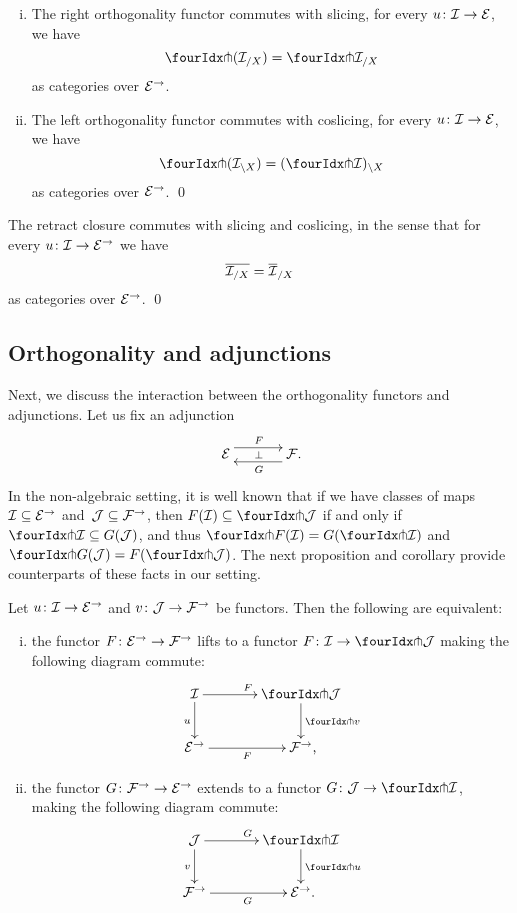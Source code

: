 \documentclass[reqno,10pt,a4paper,oneside,draft]{amsart}
\begin{document}
\begin{proposition}\label{pitchfork-slicing}
\hfill
\begin{enumerate}[(i)]
\item The right orthogonality functor commutes with slicing, \ie for every $u \co \cal{I} \to \cal{E}$, we have
\[
  \liftr{(\cal{I}_{/X})} = \liftr{\cal{I}}_{/X}
\]
as categories over $\cal{E}^\to$.
\item The left orthogonality functor commutes with coslicing, \ie for every $u \co \cal{I} \to \cal{E}$, we have
\[
  \liftl{(\cal{I}_{\backslash X})} = (\liftl{\cal{I}})_{ \backslash X}
\]
as categories over $\cal{E}^\to$.
\qed
\end{enumerate}
\end{proposition}



\begin{proposition} The retract closure commutes with slicing and coslicing, in the sense that for every $u \co \cal{I} \to \cal{E}^\to$ we have
\[
\overline{\cal{I}_{/X}} = \overline{\cal{I}}_{/X}
\]
as categories over $\cal{E}^\to$.
\qed
\end{proposition}



\subsection*{Orthogonality and adjunctions} Next, we discuss the interaction between the orthogonality functors and adjunctions.
Let us fix an adjunction
\[
\xymatrix@C+1em{
  \cal{E}
  \ar@<5pt>[r]^{F}
  \ar@{}[r]|{\bot}
&
  \cal{F}
  \ar@<5pt>[l]^{G} \rlap{.}
}
\]
In the non-algebraic setting, it is well known that if we have classes of maps $\cal{I} \subseteq \cal{E}^\to$ and~$\cal{J} \subseteq \cal{F}^\to$, then $F(\cal{I}) \subseteq \liftl{\cal{J}}$ if and only if $\liftr{\cal{I}} \subseteq G(\cal{J})$, and thus $\liftr{F(\cal{I})} = G(\liftr{\cal{I}})$ and $\liftl{G(\cal{J})} = F(\liftl{\cal{J}})$.
The next proposition and corollary provide counterparts of these facts in our setting.

\begin{proposition} \label{lift-of-adjunction}
Let $u \co \cal{I} \to \cal{E}^\to$ and $v \co \cal{J} \to \cal{F}^\to$ be functors.
Then the following are equivalent:
\begin{enumerate}[(i)]
\item the functor $F \co \cal{E}^\to \to \cal{F}^\to$ lifts to a functor $F \co \cal{I} \to \liftl{\cal{J}}$ making the following diagram commute:
\[
\xymatrix@C=1.2cm{
  \cal{I}
  \ar[r]^{F}
  \ar[d]_{u}
&
  \liftl{\cal{J}}
  \ar[d]^{\liftl{v}}
\\
  \cal{E}^\to
  \ar[r]_-{F}
&
  \cal{F}^\to
\rlap{,}}
\]
\item the functor $G \co \cal{F}^\to \to \cal{E}^\to$ extends to a functor $G \co \cal{J} \to \liftr{\cal{I}}$, making the following diagram commute:
\[
\xymatrix@C=1.2cm{
  \cal{J}
    \ar[d]_{v}
\ar[r]^{G}
&
  \liftr{\cal{I}}
  \ar[d]^{\liftr{u}}
\\
  \cal{F}^\to
   \ar[r]_{G}
&
  \cal{E}^\to
\rlap{.}}
\]
\end{enumerate}
\end{proposition}
\end{document}
